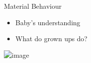 \begin{frame}{Material Behaviour}
\begin{minipage}{0.45\textwidth}
  \begin{itemize}
    \item<1> Baby's understanding 
    \item<2> What do grown ups do? 
  \end{itemize}
\end{minipage}%
\hspace{1cm}
\begin{minipage}{0.45\textwidth}
    \centering
    \includegraphics<1>[width=0.6\textwidth]{Figures/intro/baby.jpeg}
\end{minipage}
\end{frame}

